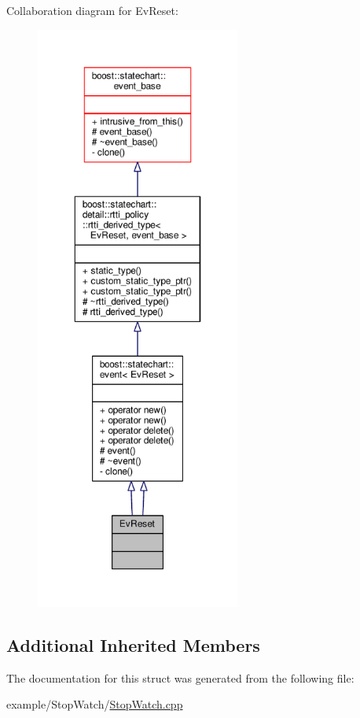 Collaboration diagram for Ev\+Reset\+:
\nopagebreak
\begin{figure}[H]
\begin{center}
\leavevmode
\includegraphics[height=550pt]{struct_ev_reset__coll__graph}
\end{center}
\end{figure}
\subsection*{Additional Inherited Members}


The documentation for this struct was generated from the following file\+:\begin{DoxyCompactItemize}
\item 
example/\+Stop\+Watch/\mbox{\hyperlink{_stop_watch_8cpp}{Stop\+Watch.\+cpp}}\end{DoxyCompactItemize}
